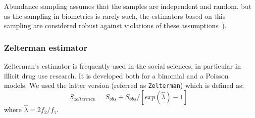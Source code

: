 \documentclass[sigconf,review,anonymous]{acmart}
\newcommand{\Zelterman}{Zelterman\xspace}
\newcounter{todocounter}
\newcommand{\todo}[1]{\marginpar{$|$}\textcolor{red}{\stepcounter{todocounter}\footnote[\thetodocounter]{\textcolor{red}{\textbf{TODO }}\textit{#1}}}}
\def\<#1>{\texttt{#1}}
\renewcommand{\todo}[1]{}
\begin{document}
Abundance sampling assumes that the samples are independent and random,
but as the sampling in biometrics is rarely such, the estimators based on this
sampling are considered robust against violations of these assumptions~\cite{gotelli2011estimating}). 
%


\subsubsection{\Zelterman estimator~\cite{bohning2010some}}
Zelterman's estimator is frequently used in the social sciences, in particular in illicit drug use research.
It is developed both for a binomial and a Poisson models.
We used the latter version (referred as \<Zelterman>) which is defined as:
\begin{displaymath}
    S_{zelterman} = S_{obs} + S_{obs}/[exp(\hat{\lambda}) - 1]
\end{displaymath}
where $\hat{\lambda} = 2f_2/f_1$.
\end{document}
